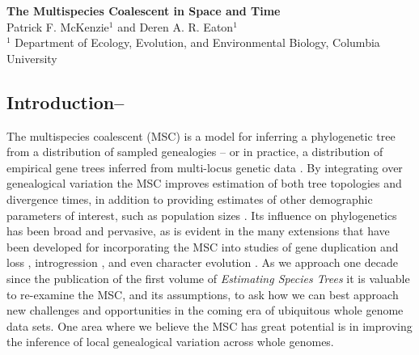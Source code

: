 \documentclass[11pt]{article}
\begin{document}
\begin{center}
{\bf \Large The Multispecies Coalescent in Space and Time}\\[0.25cm]

Patrick F. McKenzie$^{1}$ and Deren A. R. Eaton$^{1}$\\[0.25cm]

$^{1}$ Department of Ecology, Evolution, and Environmental Biology, Columbia University
\end{center}

\RaggedRight


\subsection{Introduction--} 

\noindent The multispecies coalescent (MSC) is a model for inferring a phylogenetic tree from a distribution of sampled genealogies -- or in practice, a distribution of empirical gene trees inferred from multi-locus genetic data \citep{maddison_gene_1997, maddison_inferring_2006, degnan_gene_2009}. By integrating over genealogical variation the MSC improves estimation of both tree topologies and divergence times, in addition to providing estimates of other demographic parameters of interest, such as population sizes \citep{edwards_perspective_2000, fang_estimating_2020}. 
Its influence on phylogenetics has been broad and pervasive, as is evident in the many extensions that have been developed for incorporating the MSC into studies of gene duplication and loss \citep{rasmussen_unified_2012}, introgression \citep{yu_coalescent_2011}, and even character evolution \citep{guerrero_quantifying_2018}. As we approach one decade since the publication of the first volume of \emph{Estimating Species Trees} \citep{knowles_estimating_2011} it is valuable to re-examine the MSC, and its assumptions, to ask how we can best approach new challenges and opportunities in the coming era of ubiquitous whole genome data sets. One area where we believe the MSC has great potential is in improving the inference of local genealogical variation across whole genomes. 

\end{document}
